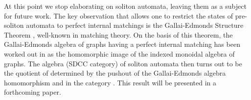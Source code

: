 \documentclass{eptcs}
\begin{document}
At this point we stop elaborating on soliton automata, leaving them as a subject for future
work. The key observation that allows one to restrict the states of pre-soliton automata to
perfect internal matchings is the Gallai-Edmonds Structure Theorem \cite{lov}, well-known in
matching theory. On the basis of this theorem, the Gallai-Edmonds algebra of graphs having
a perfect internal matching has been worked out in \cite{mun} as the homomorphic image of
the indexed monoidal algebra of graphs. The algebra (SDCC category) of soliton automata then turns out 
to be the quotient of  determined by the pushout of the Gallai-Edmonds algebra homomorphism 
and  in the category . This result will be presented in a 
forthcoming paper. 
 \begin{thebibliography}{11}


\end{thebibliography}
\end{document}
